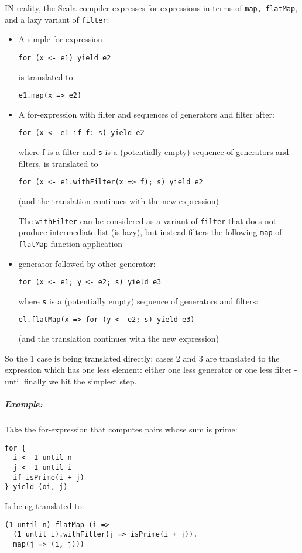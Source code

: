 \documentclass{scrartcl}
\newcommand{\example}{\subparagraph{Example:}} %
\begin{document}
IN reality, the Scala compiler expresses for-expressions in terms of
\lstinline|map, flatMap|, and a lazy variant of \lstinline|filter|:
\begin{itemize}
\item A simple for-expression
\begin{lstlisting}
for (x <- e1) yield e2
\end{lstlisting}
is translated to
\begin{lstlisting}
e1.map(x => e2)
\end{lstlisting}
\item A for-expression with filter and sequences of generators and filter after:
\begin{lstlisting}
for (x <- e1 if f: s) yield e2
\end{lstlisting}
  where f is a filter and \lstinline|s| is a (potentially empty) sequence of
  generators and filters, is translated to
\begin{lstlisting}
for (x <- e1.withFilter(x => f); s) yield e2
\end{lstlisting}
(and the translation continues with the new expression)

The \lstinline|withFilter| can be considered as a variant of \lstinline|filter|
that does not produce intermediate list (is lazy), but instead filters the following
\lstinline|map| of \lstinline|flatMap| function application

\item generator followed by other generator:
\begin{lstlisting}
for (x <- e1; y <- e2; s) yield e3
\end{lstlisting}
where \lstinline|s| is a (potentially empty) sequence of generators and filters:
\begin{lstlisting}
el.flatMap(x => for (y <- e2; s) yield e3)
\end{lstlisting}
(and the translation continues with the new expression)
\end{itemize}
So the 1 case is being translated directly; cases 2 and 3 are translated to the
expression which has one less element: either one less generator or one less
filter - until finally we hit the simplest step.

\example Take the for-expression that computes pairs whose sum is prime:
\begin{lstlisting}
for {
  i <- 1 until n
  j <- 1 until i
  if isPrime(i + j)
} yield (oi, j)
\end{lstlisting}
Is being translated to:
\begin{lstlisting}
(1 until n) flatMap (i =>
  (1 until i).withFilter(j => isPrime(i + j)).
  map(j => (i, j)))
\end{lstlisting}
\end{document}
